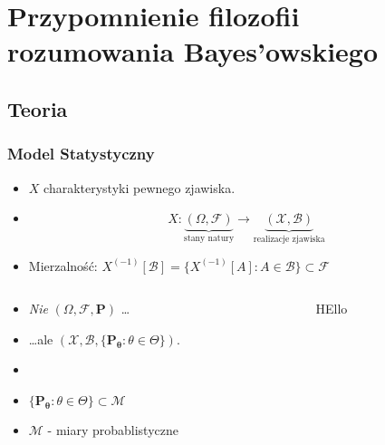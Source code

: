 \section[Bayes]{Przypomnienie filozofii rozumowania Bayes'owskiego}

\subsection{Teoria}

\begin{frame}
		\frametitle{Model Statystyczny}
	
	\begin{itemize}
		\item $X $ charakterystyki pewnego zjawiska.
		\item $$X: \underbrace{(\Omega, \mathcal{F})}_{\text{stany natury}}\rightarrow \underbrace{(\mathcal{X}, \mathcal{B})}_{\text{realizacje zjawiska}} $$
		\item Mierzalność: $ X^{(-1)} [ \mathcal{B}] = \{ X^{(-1)} [A] : A \in \mathcal{B} \} \subset \mathcal{F}$
	\end{itemize} 	


	\begin{columns}
	\begin{column}[t]{5cm}
		\begin{itemize}
			\item \emph{Nie} $( \Omega, \mathcal{F}, \mathbf{P} )$ \dots
			\item \dots ale $( \mathcal{X}, \mathcal{B}, \{\mathbf{P_\theta} : \theta \in \Theta\} )$.
			\item
			\item $\{\mathbf{P_\theta} : \theta \in \Theta\} \subset \mathcal{M} $
			\item $\mathcal{M}$ - miary probablistyczne
		\end{itemize}
	\end{column}
	\begin{column}[t]{5cm}
		\begin{center}
			HEllo	
		\end{center}		
	\end{column}
	\end{columns}
		
\end{frame}

